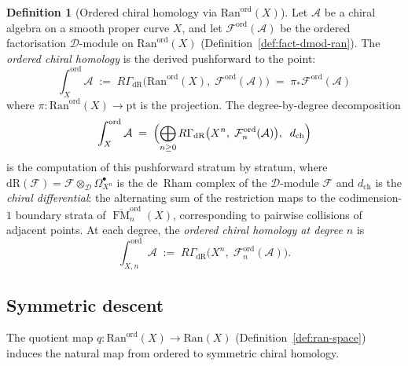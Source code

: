 \documentclass[11pt,reqno]{amsart}
\theoremstyle{definition}
\newtheorem{definition}[theorem]{Definition}
\theoremstyle{remark}
\newcommand{\cA}{\mathcal{A}}
\newcommand{\cD}{\mathcal{D}}
\newcommand{\cF}{\mathcal{F}}
\newcommand{\Ran}{\mathrm{Ran}}
\DeclareMathOperator{\FM}{FM}
\numberwithin{equation}{section}
\begin{document}
\begin{definition}[Ordered chiral homology via
$\Ran^{\mathrm{ord}}(X)$]
\label{def:ord-ch-hom}
Let $\cA$ be a chiral algebra on a smooth proper curve $X$,
and let $\cF^{\mathrm{ord}}(\cA)$ be the ordered
factorisation $\cD$-module on $\Ran^{\mathrm{ord}}(X)$
(Definition~\ref{def:fact-dmod-ran}).
The \emph{ordered chiral homology} is the derived
pushforward to the point:
\begin{equation}\label{eq:ord-ch-hom-ran}
  \int_X^{\mathrm{ord}} \cA
  \;:=\;
  R\Gamma_{\mathrm{dR}}\bigl(
  \Ran^{\mathrm{ord}}(X),\;
  \cF^{\mathrm{ord}}(\cA)\bigr)
  \;=\;
  \pi_* \cF^{\mathrm{ord}}(\cA)
\end{equation}
where $\pi \colon \Ran^{\mathrm{ord}}(X) \to \mathrm{pt}$
is the projection. The degree-by-degree decomposition
\begin{equation}\label{eq:ord-ch-hom-def}
  \int_X^{\mathrm{ord}} \cA
  \;=\;
  \Bigl(
  \bigoplus_{n \geq 0}
  R\Gamma_{\mathrm{dR}}\bigl(X^n,\;
  \cF_n^{\mathrm{ord}}(\cA)\bigr),
  \;\; d_{\mathrm{ch}}
  \Bigr)
\end{equation}
is the computation of this pushforward stratum by stratum,
where $\mathrm{dR}(\cF) = \cF \otimes_{\cD}
\Omega^{\bullet}_{X^n}$ is the de~Rham complex of the
$\cD$-module $\cF$ and $d_{\mathrm{ch}}$ is the
\emph{chiral differential}: the alternating sum of the
restriction maps to the codimension-$1$ boundary strata of
$\overline{\FM}_n^{\mathrm{ord}}(X)$, corresponding to
pairwise collisions of adjacent points. At each
degree, the \emph{ordered chiral homology at degree $n$} is
\begin{equation}\label{eq:total-ord-ch}
  \int_{X,n}^{\mathrm{ord}} \cA
  \;:=\;
  R\Gamma_{\mathrm{dR}}\bigl(X^n,\;
  \cF_n^{\mathrm{ord}}(\cA)\bigr).
\end{equation}
\end{definition}

\subsection{Symmetric descent}
\label{subsec:sym-descent}

The quotient map
$q \colon \Ran^{\mathrm{ord}}(X) \to \Ran(X)$
(Definition~\ref{def:ran-space}) induces the natural map
from ordered to symmetric chiral homology.
\end{document}
